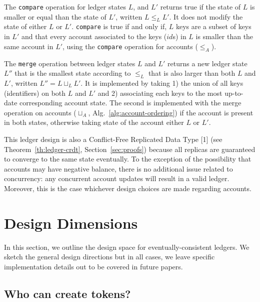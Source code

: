 \documentclass[9pt, oneside]{article}   	%
\begin{document}
The \texttt{compare} operation for ledger states $L$, and $L'$ returns true if the state of $L$ is smaller or equal than the state of $L'$, written $L \leq_L L'$. It does not modify the state of either $L$ or $L'$. \texttt{compare} is true if and only if, $L$ keys are a subset of keys in $L'$ and that every account associated to the keys ($id$s) in $L$ is smaller than the same account in $L'$, using the \texttt{compare} operation for accounts ($\leq_A$).

The \texttt{merge} operation between ledger states $L$ and $L'$ returns a new ledger state $L''$ that is the smallest state according to $\leq_L$ that is also larger than both $L$ and $L'$, written $L'' = L \sqcup_L L'$. It is implemented by taking 1) the union of all keys (identifiers) on both $L$ and $L'$ and 2) associating each keys to the most up-to-date corresponding account state. The second is implemented with the merge operation on accounts ($\sqcup_A$, Alg.~\ref{alg:account-ordering}) if the account is present in both states, otherwise taking state of the account either $L$ or $L'$.


This ledger design is also a Conflict-Free Replicated Data Type [1] (see Theorem~\ref{th:ledger-crdt}, Section~\ref{sec:proofs}) because all replicas are guaranteed to converge to the same state eventually. To the exception of the possibility that accounts may have negative balance, there is no additional issue related to concurrency: any concurrent account updates will result in a valid ledger. Moreover, this is the case whichever design choices are made regarding accounts.


\section{Design Dimensions}
\label{sec:design-issues}

In this section, we outline the design space for eventually-consistent ledgers. We sketch the general design directions but in all cases, we leave specific implementation details out to be covered in future papers.

\subsection{Who can create tokens?}
\end{document}
